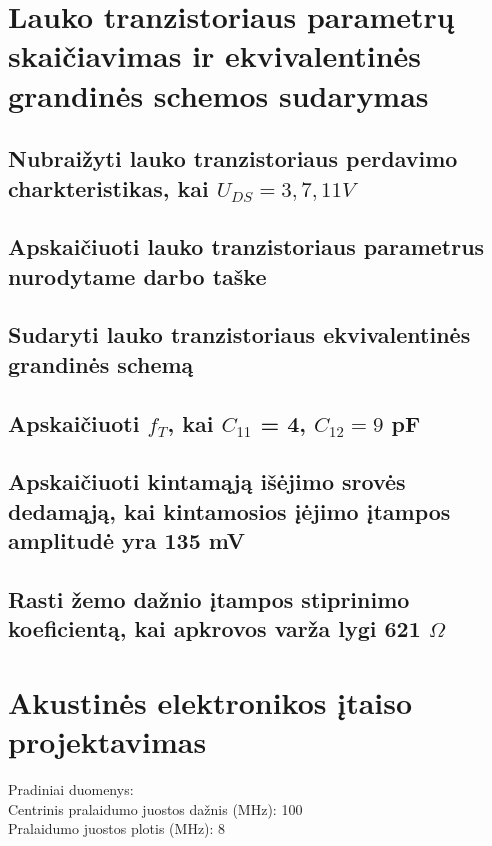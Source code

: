 \documentclass[11pt,a4paper]{article}
\begin{document}
\section{Lauko tranzistoriaus parametrų skaičiavimas ir ekvivalentinės grandinės schemos sudarymas}
\subsection{Nubraižyti lauko tranzistoriaus perdavimo charkteristikas, kai $U_{DS} = 3,7,11 V$}
\subsection{Apskaičiuoti lauko tranzistoriaus parametrus nurodytame darbo taške}
\subsection{Sudaryti lauko tranzistoriaus ekvivalentinės grandinės schemą}
\subsection{Apskaičiuoti $f_{T}$, kai $C_{11}$ = 4, $C_{12} = 9$ pF}
\subsection{Apskaičiuoti kintamąją išėjimo srovės dedamąją, kai kintamosios įėjimo įtampos amplitudė yra 135 mV}
\subsection{Rasti žemo dažnio įtampos stiprinimo koeficientą, kai apkrovos varža lygi 621 $\Omega$}

\section{Akustinės elektronikos įtaiso projektavimas}
Pradiniai duomenys:\\
Centrinis pralaidumo juostos dažnis (MHz): 100\\
Pralaidumo juostos plotis (MHz): 8
\end{document}

